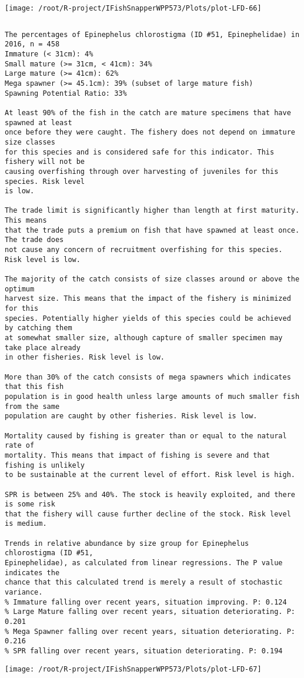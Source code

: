 \documentclass{report}\usepackage[]{graphicx}\usepackage[]{color}
\makeatletter
\def\maxwidth{ %
  \ifdim\Gin@nat@width>\linewidth
    \linewidth
  \else
    \Gin@nat@width
  \fi
}
\newenvironment{kframe}{%
 \def\at@end@of@kframe{}%
 \ifinner\ifhmode%
  \def\at@end@of@kframe{\end{minipage}}%
  \begin{minipage}{\columnwidth}%
 \fi\fi%
 \def\FrameCommand##1{\hskip\@totalleftmargin \hskip-\fboxsep
 \colorbox{shadecolor}{##1}\hskip-\fboxsep
     \hskip-\linewidth \hskip-\@totalleftmargin \hskip\columnwidth}%
 \MakeFramed {\advance\hsize-\width
   \@totalleftmargin\z@ \linewidth\hsize
   \@setminipage}}%
 {\par\unskip\endMakeFramed%
 \at@end@of@kframe}
\newenvironment{knitrout}{}{} %
\makeatother
\begin{document}
\begin{knitrout}
\texttt{[image: /root/R-project/IFishSnapperWPP573/Plots/plot-LFD-66]} 
\begin{kframe}\begin{verbatim}
\end{verbatim}
\end{kframe}
\clearpage
\newpage
\begin{kframe}\begin{verbatim}The percentages of Epinephelus chlorostigma (ID #51, Epinephelidae) in 2016, n = 458
Immature (< 31cm): 4%
Small mature (>= 31cm, < 41cm): 34%
Large mature (>= 41cm): 62%
Mega spawner (>= 45.1cm): 39% (subset of large mature fish)
Spawning Potential Ratio: 33%
 
At least 90% of the fish in the catch are mature specimens that have spawned at least
once before they were caught. The fishery does not depend on immature size classes
for this species and is considered safe for this indicator. This fishery will not be
causing overfishing through over harvesting of juveniles for this species. Risk level
is low.

The trade limit is significantly higher than length at first maturity.  This means
that the trade puts a premium on fish that have spawned at least once. The trade does
not cause any concern of recruitment overfishing for this species. Risk level is low.

The majority of the catch consists of size classes around or above the optimum
harvest size. This means that the impact of the fishery is minimized for this
species. Potentially higher yields of this species could be achieved by catching them
at somewhat smaller size, although capture of smaller specimen may take place already
in other fisheries. Risk level is low.

More than 30% of the catch consists of mega spawners which indicates that this fish
population is in good health unless large amounts of much smaller fish from the same
population are caught by other fisheries. Risk level is low.
 
Mortality caused by fishing is greater than or equal to the natural rate of
mortality. This means that impact of fishing is severe and that fishing is unlikely
to be sustainable at the current level of effort. Risk level is high.
 
SPR is between 25% and 40%. The stock is heavily exploited, and there is some risk
that the fishery will cause further decline of the stock. Risk level is medium.
 
Trends in relative abundance by size group for Epinephelus chlorostigma (ID #51,
Epinephelidae), as calculated from linear regressions. The P value indicates the
chance that this calculated trend is merely a result of stochastic variance.
% Immature falling over recent years, situation improving. P: 0.124
% Large Mature falling over recent years, situation deteriorating. P: 0.201
% Mega Spawner falling over recent years, situation deteriorating. P: 0.216
% SPR falling over recent years, situation deteriorating. P: 0.194
\end{verbatim}
\end{kframe}
\texttt{[image: /root/R-project/IFishSnapperWPP573/Plots/plot-LFD-67]} 


\end{knitrout}
\end{document}

